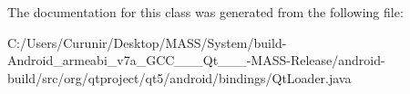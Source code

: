 The documentation for this class was generated from the following file\+:\begin{DoxyCompactItemize}
\item 
C\+:/\+Users/\+Curunir/\+Desktop/\+M\+A\+S\+S/\+System/build-\/\+Android\+\_\+armeabi\+\_\+v7a\+\_\+\+G\+C\+C\+\_\+\_\+\_\+\+Qt\+\_\+\_\+\_-\/\+M\+A\+S\+S-\/\+Release/android-\/build/src/org/qtproject/qt5/android/bindings/Qt\+Loader.\+java\end{DoxyCompactItemize}
